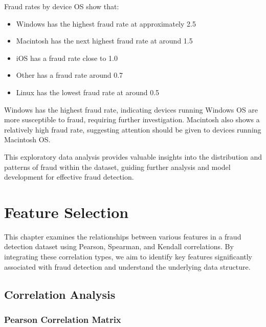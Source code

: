 \documentclass[12pt,a4paper]{report}
\begin{document}
Fraud rates by device OS show that:

\begin{itemize}
    \item Windows has the highest fraud rate at approximately 2.5%
    \item Macintosh has the next highest fraud rate at around 1.5%
    \item iOS has a fraud rate close to 1.0%
    \item Other has a fraud rate around 0.7%
    \item Linux has the lowest fraud rate at around 0.5%
\end{itemize}

Windows has the highest fraud rate, indicating devices running Windows OS are more susceptible to fraud, requiring further investigation. Macintosh also shows a relatively high fraud rate, suggesting attention should be given to devices running Macintosh OS.

This exploratory data analysis provides valuable insights into the distribution and patterns of fraud within the dataset, guiding further analysis and model development for effective fraud detection.








\chapter{Feature Selection}


This chapter examines the relationships between various features in a fraud detection dataset using Pearson, Spearman, and Kendall correlations. By integrating these correlation types, we aim to identify key features significantly associated with fraud detection and understand the underlying data structure.

\section{Correlation Analysis}

\subsection{Pearson Correlation Matrix}
\end{document}
